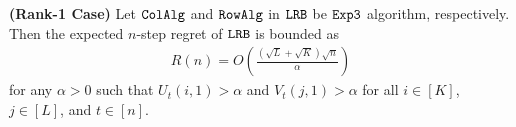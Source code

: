 


\begin{theorem} \textbf{(Rank-1 Case)} 
\label{thm:upper bound} Let ${\tt ColAlg}$ and ${\tt RowAlg}$ in ${\tt LRB}$ be ${\tt Exp3}$ algorithm, respectively. Then the expected $n$-step regret of ${\tt LRB}$ is bounded as
\begin{align*}
  R(n) = O\left(\frac{\left(\sqrt{L } + \sqrt{K }\right)\sqrt{n}}{\alpha}\right)
\end{align*}
for any $\alpha > 0$ such that $U_{t}(i,1) > \alpha$ and $V_{t}(j,1) > \alpha$ for all $i \in [K]$, $j \in [L]$, and $t \in [n]$.


\end{theorem}
